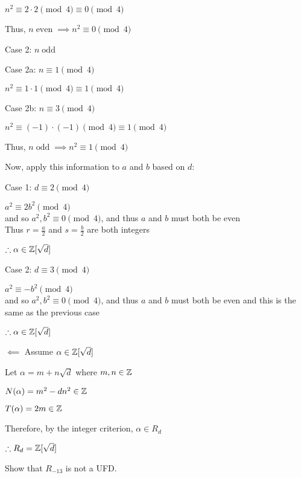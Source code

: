 \documentclass[letterpaper,12pt,fleqn]{article}
\newcommand{\sd}{\sqrt{d}}
\newcommand{\Zd}{\Z[\sd]}
\renewcommand{\a}{\alpha}
\DeclareMathOperator{\even}{even}
\DeclareMathOperator{\odd}{odd}
\begin{document}
\begin{enumerate}
\begin{description}
\begin{description}
\begin{description}
        $n^2\equiv2\cdot2\pmod4\equiv0\pmod4$
      \end{description}
      Thus, $n \even\implies n^2\equiv0\pmod4 $
      
    \item Case 2: $n \odd$
      \begin{description}
      \item Case 2a: $n\equiv1\pmod4$

        $n^2\equiv1\cdot1\pmod4\equiv1\pmod4$

      \item Case 2b: $n\equiv3\pmod4$

        $n^2\equiv(-1)\cdot(-1)\pmod4\equiv1\pmod4$
      \end{description}
      Thus, $n \odd\implies n^2\equiv1\pmod4 $
    \end{description}

    Now, apply this information to $a$ and $b$ based on $d$:
    \begin{description}
    \item Case 1: $d\equiv2\pmod4$

      $a^2\equiv 2b^2\pmod4$ \\
      and so $a^2,b^2\equiv0\pmod4$, and thus $a$ and $b$ must both be even \\
      Thus $r=\frac{a}{2}$ and $s=\frac{b}{2}$ are both integers

      $\therefore\a\in\Zd$

    \item Case 2: $d\equiv3\pmod4$

      $a^2\equiv -b^2\pmod4$ \\
      and so $a^2,b^2\equiv0\pmod4$, and thus $a$ and $b$ must both be even
      and this is the same as the previous case

      $\therefore\a\in\Zd$
    \end{description}

  \item $\impliedby$ Assume $\a\in\Zd$

    Let $\a=m+n\sd$ where $m,n\in\mathbb{Z}$

    $N(\a)=m^2-dn^2\in\Z$

    $T(\a)=2m\in\Z$
    
    Therefore, by the integer criterion, $\a\in R_d$
  \end{description}

  $\therefore R_d=\Zd$

\item Show that $R_{-13}$ is not a UFD.


\end{enumerate}
\end{document}
